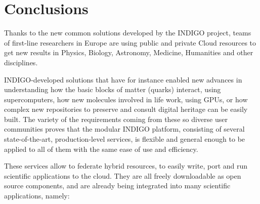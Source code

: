 \documentclass{article}
\begin{document}
{\section{Conclusions}
\label{sec:conclusions}

Thanks to the new common solutions developed by the INDIGO project, teams of first-line researchers in Europe are using public and private Cloud resources to get new results in Physics, Biology, Astronomy, Medicine, Humanities and other disciplines. 

INDIGO-developed solutions that have for instance enabled new advances in understanding how the basic blocks of matter (quarks) interact, using supercomputers, how new molecules involved in life work, using GPUs, or how complex new repositories to preserve and consult digital heritage can be easily built. The variety of the requirements coming from these so diverse user communities proves that the modular INDIGO platform, consisting of several state-of-the-art, production-level services, is flexible and general enough to be applied to all of them with the same ease of use and efficiency. 

These services allow to federate hybrid resources, to easily write, port and run scientific applications to the cloud. They are all freely downloadable as open source components, and are already being integrated into many scientific applications, namely: 

}
\end{document}
